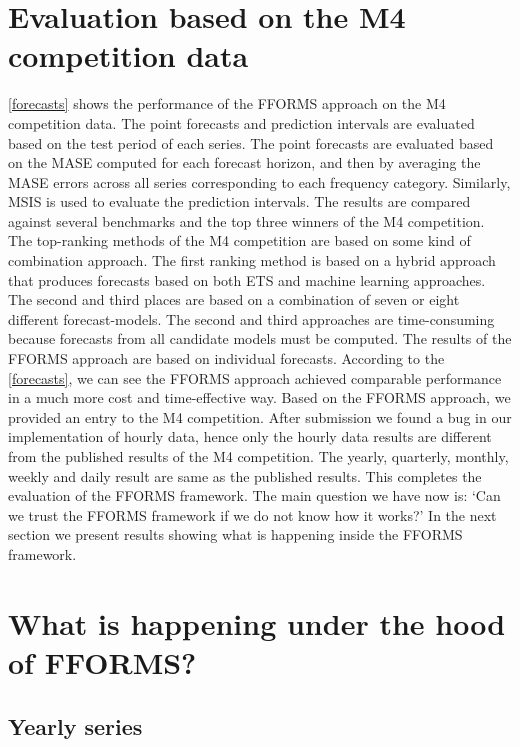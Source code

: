 \documentclass[11pt,a4paper,]{article}
\begin{document}
\hypertarget{results1}{%
\section{Evaluation based on the M4 competition data}\label{results1}}

\autoref{forecasts} shows the performance of the FFORMS approach on the M4 competition data. The point forecasts and prediction intervals are evaluated based on the test period of each series. The point forecasts are evaluated based on the MASE computed for each forecast horizon, and then by averaging the MASE errors across all series corresponding to each frequency category. Similarly, MSIS is used to evaluate the prediction intervals. The results are compared against several benchmarks and the top three winners of the M4 competition. The top-ranking methods of the M4 competition are based on some kind of combination approach. The first ranking method is based on a hybrid approach that produces forecasts based on both ETS and machine learning approaches. The second and third places are based on a combination of seven or eight different forecast-models. The second and third approaches are time-consuming because forecasts from all candidate models must be computed. The results of the FFORMS approach are based on individual forecasts. According to the \autoref{forecasts}, we can see the FFORMS approach achieved comparable performance in a much more cost and time-effective way. Based on the FFORMS approach, we provided an entry to the M4 competition. After submission we found a bug in our implementation of hourly data, hence only the hourly data results are different from the published results of the M4 competition. The yearly, quarterly, monthly, weekly and daily result are same as the published results. This completes the evaluation of the FFORMS framework. The main question we have now is: `Can we trust the FFORMS framework if we do not know how it works?' In the next section we present results showing what is happening inside the FFORMS framework.

\hypertarget{results2}{%
\section{What is happening under the hood of FFORMS?}\label{results2}}

\hypertarget{yearly-series}{%
\subsection{Yearly series}\label{yearly-series}}
\end{document}
